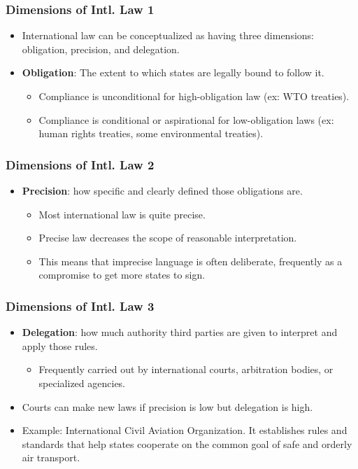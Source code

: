 \documentclass{beamer}
\begin{document}
\begin{frame} 
	\frametitle{\LARGE{Dimensions of Intl. Law 1}}
	\begin{itemize}
		\item International law can be conceptualized as having three dimensions: obligation, precision, and delegation. \pause
		\item \textbf{Obligation}: The extent to which states are legally bound to follow it. \pause
		\begin{itemize}
			\item Compliance is unconditional for high-obligation law (ex: WTO treaties).
			\item Compliance is conditional or aspirational for low-obligation laws (ex: human rights treaties, some environmental treaties).
		\end{itemize}
	\end{itemize}
\end{frame}

\begin{frame} 
	\frametitle{\LARGE{Dimensions of Intl. Law 2}}
	\begin{itemize}
		\item \textbf{Precision}: how specific and clearly defined those obligations are. \pause
		\begin{itemize}
			\item Most international law is quite precise. \pause
			\item Precise law decreases the scope of reasonable interpretation. \pause
			\item This means that imprecise language is often deliberate, frequently as a compromise to get more states to sign.
		\end{itemize}
	\end{itemize}
\end{frame}

\begin{frame} 
	\frametitle{\LARGE{Dimensions of Intl. Law 3}}
	\begin{itemize}
		\item \textbf{Delegation}: how much authority third parties are given to interpret and apply those rules. \pause
		\begin{itemize}
			\item Frequently carried out by international courts, arbitration bodies, or specialized agencies. \pause
		\end{itemize}
		\item Courts can make new laws if precision is low but delegation is high.
		\item Example: International Civil Aviation Organization. It establishes rules and standards that help states cooperate on the common goal of safe and orderly air transport.
	\end{itemize}
\end{frame}
\end{document}

